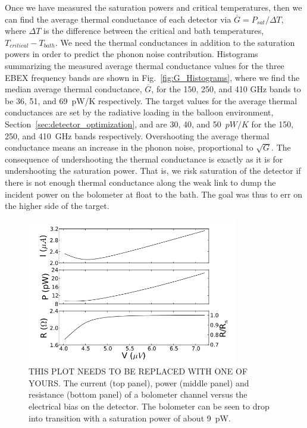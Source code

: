 Once we have measured the saturation powers and critical temperatures, then we can find the average thermal conductance of each detector via $\overline{G} = P_{sat}/\Delta T$, where $\Delta T$ is the difference between the critical and bath temperatures, $T_{critical} - T_{bath}$. 
We need the thermal conductances in addition to the saturation powers in order to predict the phonon noise contribution. 
Histograms summarizing the measured average thermal conductance values for the three \ac{EBEX} frequency bands are shown in Fig.~\ref{fig:G_Histograms}, where we find the median average thermal conductance, $\overline{G}$, for the 150, 250, and 410 GHz bands to be 36, 51, and 69~pW/K respectively. 
The target values for the average thermal conductances are set by the radiative loading in the balloon environment, Section~\ref{sec:detector_optimization}, and are 30, 40, and 50~$pW/K$ for the 150, 250, and 410~GHz bands respectively. 
Overshooting the average thermal conductance means an increase in the phonon noise, proportional to $\sqrt{G}$. 
The consequence of undershooting the thermal conductance is exactly as it is for undershooting the saturation power. 
That is, we risk saturation of the detector if there is not enough thermal conductance along the weak link to dump the incident power on the bolometer at float to the bath. 
The goal was thus to err on the higher side of the target. 



\begin{figure}[htbp]
\begin{center}
\includegraphics[height=2.5in]{figures/IV_curve.png} 
\caption{THIS PLOT NEEDS TO BE REPLACED WITH ONE OF YOURS. The current (top panel), power (middle panel) and resistance (bottom panel) of a bolometer channel versus the electrical bias on the detector. The bolometer can be seen to drop into transition with a saturation power of about 9~pW. 
\label{fig:bolo_iv_curve} }
\end{center}
\end{figure}



